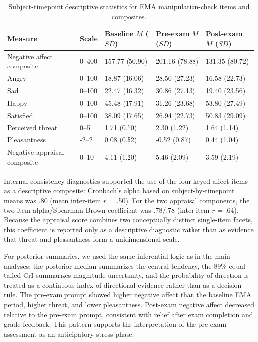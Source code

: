 \documentclass[
  english,
  man,floatsintext]{apa6}
\begin{document}
\begin{table}

\caption{\label{tab:table-s-mc-descriptives}Subject-timepoint descriptive statistics for EMA manipulation-check items and composites.}
\centering
\begin{tabular}[t]{lllll}
\toprule
Measure & Scale & Baseline $M$ ($SD$) & Pre-exam $M$ ($SD$) & Post-exam $M$ ($SD$)\\
\midrule
Negative affect composite & 0--400 & 157.77 (50.90) & 201.16 (78.88) & 131.35 (80.72)\\
Angry & 0--100 & 18.87 (16.06) & 28.50 (27.23) & 16.58 (22.73)\\
Sad & 0--100 & 22.47 (16.32) & 30.86 (27.13) & 19.40 (23.56)\\
Happy & 0--100 & 45.48 (17.91) & 31.26 (23.68) & 53.80 (27.49)\\
Satisfied & 0--100 & 38.09 (17.65) & 26.94 (22.73) & 50.83 (29.09)\\
\addlinespace
Perceived threat & 0--5 & 1.71 (0.70) & 2.30 (1.22) & 1.64 (1.14)\\
Pleasantness & -2--2 & 0.08 (0.52) & -0.52 (0.87) & 0.44 (1.04)\\
Negative appraisal composite & 0--10 & 4.11 (1.20) & 5.46 (2.09) & 3.59 (2.19)\\
\bottomrule
\end{tabular}
\end{table}

Internal consistency diagnostics supported the use of the four keyed affect items as a descriptive composite: Cronbach's alpha based on subject-by-timepoint means was .80 (mean inter-item \(r\) = .50). For the two appraisal components, the two-item alpha/Spearman-Brown coefficient was .78/.78 (inter-item \(r\) = .64). Because the appraisal score combines two conceptually distinct single-item facets, this coefficient is reported only as a descriptive diagnostic rather than as evidence that threat and pleasantness form a unidimensional scale.

For posterior summaries, we used the same inferential logic as in the main analyses: the posterior median summarizes the central tendency, the 89\% equal-tailed CrI summarizes magnitude uncertainty, and the probability of direction is treated as a continuous index of directional evidence rather than as a decision rule. The pre-exam prompt showed higher negative affect than the baseline EMA period, higher threat, and lower pleasantness. Post-exam negative affect decreased relative to the pre-exam prompt, consistent with relief after exam completion and grade feedback. This pattern supports the interpretation of the pre-exam assessment as an anticipatory-stress phase.
\end{document}
